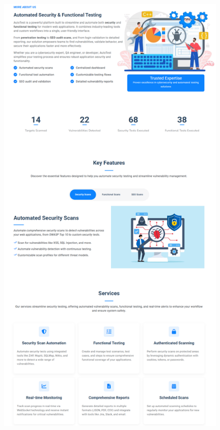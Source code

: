 \begin{justify}
\begin{enumerate}[label=\Alph*.]
\begin{figure}[H]
\begin{minipage}[b]{0.495\linewidth}
                        \includegraphics[width=\linewidth]{chapitres/ch3Sp1/section/sprint1/img/interface/a1.png}
                    \end{minipage}
                    \hfill
                    \begin{minipage}[b]{0.495\linewidth}

\end{minipage}
\end{figure}
\end{enumerate}
\end{justify}
